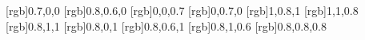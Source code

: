 [rgb]{0.7,0,0}	%
[rgb]{0.8,0.6,0}	%
[rgb]{0,0,0.7}		%
[rgb]{0,0.7,0}		%
[rgb]{1,0.8,1}	%
[rgb]{1,1,0.8}	%
[rgb]{0.8,1,1}	%
[rgb]{0.8,0,1}	%
[rgb]{0.8,0.6,1}  %
[rgb]{0.8,1,0.6}		%
[rgb]{0.8,0.8,0.8}	%









